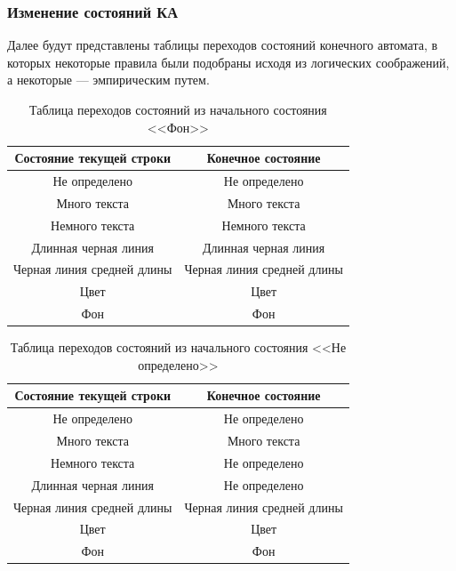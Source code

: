 \subsubsection*{Изменение состояний КА}

Далее будут представлены таблицы переходов состояний конечного автомата, в которых некоторые правила были подобраны исходя из логических соображений, а некоторые --- эмпирическим путем.

\begin{table}[H]
    \centering
    \caption{Таблица переходов состояний из начального состояния <<Фон>>}
    \label{tab:background}
    \begin{tabular}{|c|c|}
        \hline
        \textbf{Состояние текущей строки} & \textbf{Конечное состояние} \\ \hline
        Не определено & Не определено \\ \hline
        Много текста & Много текста \\ \hline
        Немного текста & Немного текста \\ \hline
        Длинная черная линия & Длинная черная линия \\ \hline
        Черная линия средней длины & Черная линия средней длины \\ \hline
        Цвет & Цвет \\ \hline
        Фон & Фон \\ \hline
    \end{tabular}
\end{table}

\begin{table}[H]
    \centering
    \caption{Таблица переходов состояний из начального состояния <<Не определено>>}
    \label{tab:undefined}
    \begin{tabular}{|c|c|}
        \hline
        \textbf{Состояние текущей строки} & \textbf{Конечное состояние} \\ \hline
        Не определено & Не определено \\ \hline
        Много текста & Много текста \\ \hline
        Немного текста & Не определено \\ \hline
        Длинная черная линия & Не определено \\ \hline
        Черная линия средней длины & Черная линия средней длины \\ \hline
        Цвет & Цвет \\ \hline
        Фон & Фон \\ \hline
    \end{tabular}
\end{table}

